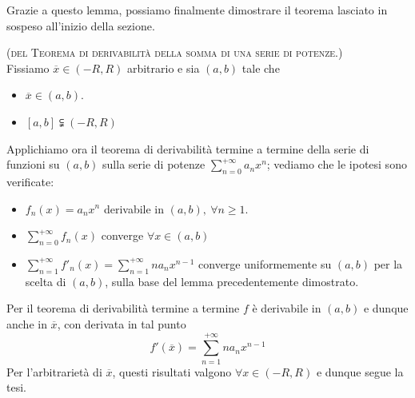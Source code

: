 Grazie a questo lemma, possiamo finalmente dimostrare il teorema lasciato in sospeso all'inizio della sezione.
\begin{demonstration}\textsc{(del Teorema di derivabilità della somma di una serie di potenze.)}\\
	Fissiamo $\overline{x}\in\left(-R,R\right)$ arbitrario e sia $\left(a,b\right)$ tale che
	\begin{itemize}
		\item $\overline{x}\in\left(a,b\right)$.
		\item $\left[a,b\right]\subsetneqq\left(-R,R\right)$
	\end{itemize}
Applichiamo ora il teorema di derivabilità termine a termine della serie di funzioni su $\left(a,b\right)$ sulla serie di potenze $\displaystyle\sum_{n=0}^{+\infty}a_nx^n$; vediamo che le ipotesi sono verificate:
\begin{itemize}
	\item $f_n\left(x\right)=a_nx^n$ derivabile in $\left(a,b\right),\ \forall n\geq 1$.
	\item $\displaystyle\sum_{n=0}^{+\infty}f_n\left(x\right)$ converge $\forall x\in\left(a,b\right)$
	\item $\displaystyle\sum_{n=1}^{+\infty}f'_n\left(x\right)=\sum_{n=1}^{+\infty}na_nx^{n-1}$ converge uniformemente su $\left(a,b\right)$ per la scelta di $\left(a,b\right)$, sulla base del lemma precedentemente dimostrato.
\end{itemize}
Per il teorema di derivabilità termine a termine $f$ è derivabile in $\left(a,b\right)$ e dunque anche in $\overline{x}$, con derivata in tal punto
\begin{equation*}
	f'\left(\overline{x}\right)=\sum_{n=1}^{+\infty}na_nx^{n-1}
\end{equation*}
Per l'arbitrarietà di $\overline{x}$, questi risultati valgono $\forall x\in\left(-R,R\right)$ e dunque segue la tesi.
\end{demonstration}
